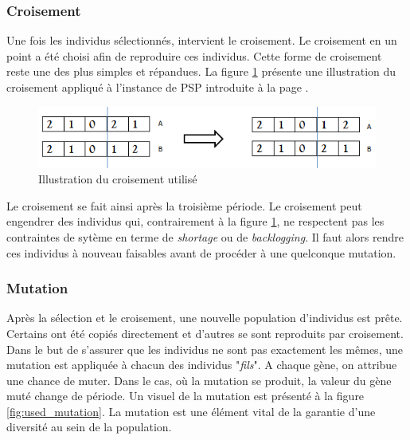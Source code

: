 \documentclass[12pt,a4paper]{article}
\begin{document}
		\subsubsection{Croisement}
		
		Une fois les individus sélectionnés, intervient le croisement. Le croisement en un point a été choisi afin de reproduire ces individus. Cette forme de croisement reste une des plus simples et répandues. La figure \ref{fig:used_cross_over} présente une illustration du croisement appliqué à l'instance de PSP introduite à la page \pageref{ex:psp}. \\
		\begin{figure}[!h]
			\begin{center}
				\includegraphics[scale=.5]{img/cross_over_fig.png}
				\caption{Illustration du croisement utilisé}
				\label{fig:used_cross_over}
			\end{center}
		\end{figure}
		
		\hspace*{.5cm} Le croisement se fait ainsi après la troisième période. Le croisement peut engendrer des individus qui, contrairement à la figure \ref{fig:used_cross_over}, ne respectent pas les contraintes de sytème en terme de \emph{shortage} ou de \emph{backlogging}. Il faut alors rendre ces individus à nouveau faisables avant de procéder à une quelconque mutation.
		  
	\subsubsection{Mutation}
	Après la sélection et le croisement, une nouvelle population d'individus est prête. Certains ont été copiés directement et d'autres se sont reproduits par croisement. Dans le but de s'assurer que les individus ne sont pas exactement les mêmes, une mutation est appliquée à chacun des individus "\emph{fils}". A chaque gène, on attribue une chance de muter. Dans le cas, où la mutation se produit, la valeur du gène muté change de période. Un visuel de la mutation est présenté à la figure \ref{fig:used_mutation}. La mutation est une élément vital de la garantie d'une diversité au sein de la population. 
	
\end{document}
